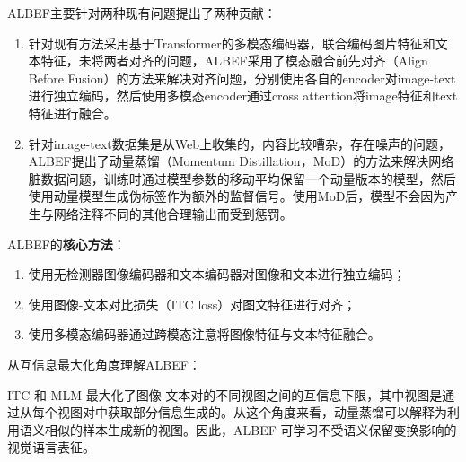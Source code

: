 \documentclass[zihao=false,fontset=windows]{ctexart}
\begin{document}
\vspace{0.45em}
\par\vspace{1.15em}\par\vspace{0.28em}
ALBEF主要针对两种现有问题提出了两种贡献：\par
\begin{enumerate}
\item 针对\textcolor{feishuBlue}{现有方法采用基于Transformer的多模态编码器，联合编码图片特征和文本特征，未将两者对齐}的问题，ALBEF采用了模态融合前先对齐（Align Before Fusion）的方法来解决对齐问题，分别使用各自的encoder对image-text进行独立编码，然后使用多模态encoder通过cross attention将image特征和text特征进行融合。
\item 针对\textcolor{feishuBlue}{image-text数据集是从Web上收集的，内容比较嘈杂，存在噪声}的问题，ALBEF提出了动量蒸馏（Momentum Distillation，MoD）的方法来解决网络脏数据问题，训练时通过模型参数的移动平均保留一个动量版本的模型，然后使用动量模型生成伪标签作为额外的监督信号。使用MoD后，模型不会因为产生与网络注释不同的其他合理输出而受到惩罚。
\end{enumerate}
\vspace{0.45em}
ALBEF的\textcolor{feishuRed}{\textbf{核心方法}}：\par
\begin{enumerate}
\item 使用无检测器图像编码器和文本编码器对图像和文本进行独立编码；
\item 使用图像-文本对比损失（ITC loss）对图文特征进行对齐； 
\item 使用多模态编码器通过跨模态注意将图像特征与文本特征融合。
\end{enumerate}
从互信息最大化角度理解ALBEF：\par
ITC 和 MLM 最大化了图像-文本对的不同视图之间的互信息下限，其中视图是通过从每个视图对中获取部分信息生成的。从这个角度来看，动量蒸馏可以解释为利用语义相似的样本生成新的视图。因此，ALBEF 可学习不受语义保留变换影响的视觉语言表征。\par
\par\vspace{1.15em}\par\vspace{0.28em}
\par\vspace{0.95em}\par\vspace{0.28em}
\end{document}
